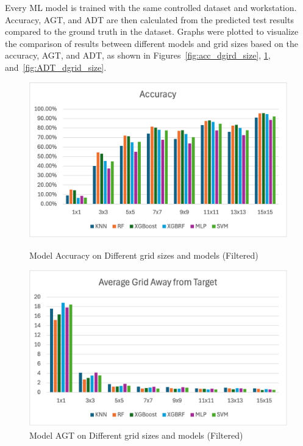 \documentclass[runningheads]{llncs}
\begin{document}
Every ML model is trained with the same controlled dataset and workstation. Accuracy, AGT, and ADT are then calculated from the predicted test results compared to the ground truth in the dataset. Graphs were plotted to visualize the comparison of results between different models and grid sizes based on the accuracy, AGT, and ADT, as shown in Figures~\ref{fig:acc_dgird_size}, \ref{fig:AGT_dgrid_size}, and~\ref{fig:ADT_dgrid_size}.

\begin{figure}[thb!]
	\begin{minipage}{0.45\linewidth}
		\centering
		\includegraphics[width=\linewidth]{figures/overview_filtered_accuracy.png}
		\caption{Model Accuracy on Different grid sizes and models (Filtered)}
		\label{fig:acc_dgird_size}
	\end{minipage}
	\hfill
	\begin{minipage}{0.45\linewidth}
		\centering
		\includegraphics[width=\linewidth]{figures/overview_filtered_agt.png}
		\caption{Model AGT on Different grid sizes and models (Filtered)}
		\label{fig:AGT_dgrid_size}
	\end{minipage}
\end{figure}
\end{document}
